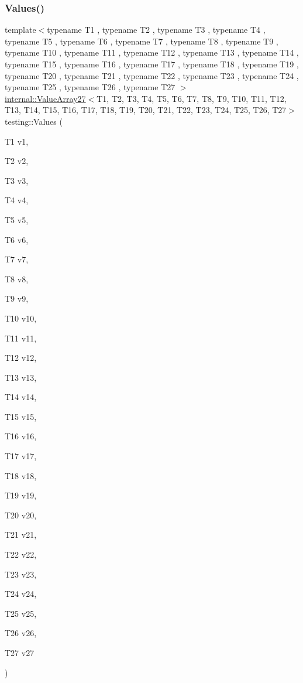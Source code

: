 \mbox{\label{namespacetesting_a089ea706f6cdde715d03ab42aa3099d3}} 
\subsubsection{\texorpdfstring{Values()}{Values()}\hspace{0.1cm}{\footnotesize\ttfamily [28/51]}}
{\footnotesize\ttfamily template$<$typename T1 , typename T2 , typename T3 , typename T4 , typename T5 , typename T6 , typename T7 , typename T8 , typename T9 , typename T10 , typename T11 , typename T12 , typename T13 , typename T14 , typename T15 , typename T16 , typename T17 , typename T18 , typename T19 , typename T20 , typename T21 , typename T22 , typename T23 , typename T24 , typename T25 , typename T26 , typename T27 $>$ \\
\mbox{\hyperlink{classtesting_1_1internal_1_1_value_array27}{internal\+::\+Value\+Array27}}$<$T1, T2, T3, T4, T5, T6, T7, T8, T9, T10, T11, T12, T13, T14, T15, T16, T17, T18, T19, T20, T21, T22, T23, T24, T25, T26, T27$>$ testing\+::\+Values (\begin{DoxyParamCaption}\item[{T1}]{v1,  }\item[{T2}]{v2,  }\item[{T3}]{v3,  }\item[{T4}]{v4,  }\item[{T5}]{v5,  }\item[{T6}]{v6,  }\item[{T7}]{v7,  }\item[{T8}]{v8,  }\item[{T9}]{v9,  }\item[{T10}]{v10,  }\item[{T11}]{v11,  }\item[{T12}]{v12,  }\item[{T13}]{v13,  }\item[{T14}]{v14,  }\item[{T15}]{v15,  }\item[{T16}]{v16,  }\item[{T17}]{v17,  }\item[{T18}]{v18,  }\item[{T19}]{v19,  }\item[{T20}]{v20,  }\item[{T21}]{v21,  }\item[{T22}]{v22,  }\item[{T23}]{v23,  }\item[{T24}]{v24,  }\item[{T25}]{v25,  }\item[{T26}]{v26,  }\item[{T27}]{v27 }\end{DoxyParamCaption})}

